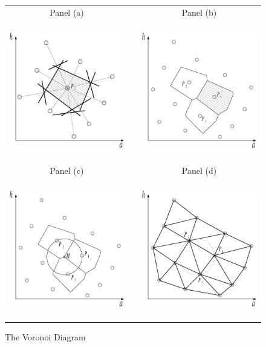 \documentclass[a4paper,12pt]{article}
\begin{document}
\begin{figure}[htbp] 
	\caption{The Voronoi Diagram}
	\label{Delaunay Triangulation}
	\centering
	\begin{tabular}{cC{1cm}c}
	Panel (a) & & Panel (b)  \\
	\includegraphics[height=6.0cm, width=6.0cm]{Abbildungen/Voronoi_1_shape.eps} & & \includegraphics[height=6.0cm, width=6.0cm]{Abbildungen/Voronoi_2_shape.eps} \\
	Panel (c) & & Panel (d)  \\
	\includegraphics[height=6.0cm, width=6.0cm]{Abbildungen/Voronoi_3.eps} & & \includegraphics[height=6.0cm, width=6.0cm]{Abbildungen/Delaunay_!.eps} \\

\end{tabular}
\end{figure}
\end{document}
